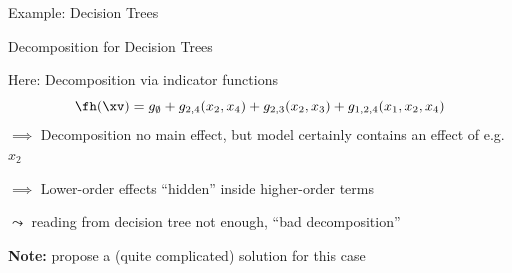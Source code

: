 \documentclass[11pt,compress,t,notes=noshow, aspectratio=169, xcolor=table]{beamer}
\begin{document}
\begin{frame}{Example: Decision Trees}
{\begin{center}
\end{center}
}

    
\end{frame}

\begin{frame}{Decomposition for Decision Trees}
    

Here: Decomposition via indicator functions
$$
\fh(\xv) = g_\emptyset + g_{2,4}(x_2, x_4) + g_{2,3}(x_2, x_3) + g_{1, 2, 4}(x_1, x_2, x_4)
$$
$\implies$ Decomposition no main effect, but model certainly contains an effect of e.g. $x_2$

$\implies$ Lower-order effects ``hidden'' inside higher-order terms

$\leadsto$ reading from decision tree not enough, ``bad decomposition''



\pause
\textbf{Note:}  propose a (quite complicated) solution for this case

\end{frame}
\end{document}
